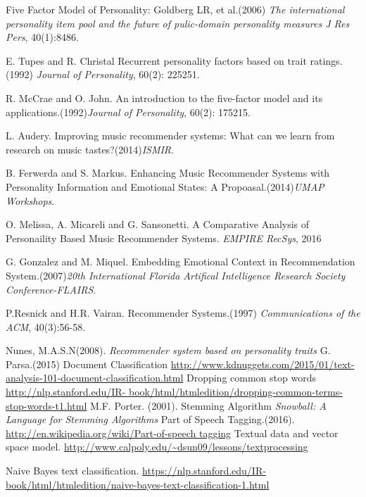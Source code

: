 
\newpage
{}
{}
\begin{thebibliography}{9}

	 Five Factor Model of Personality: Goldberg LR, et al.(2006) \textit{The international personality item pool and the future of pulic-domain personality measures J Res Pers}, 40(1):8486.
 
 E. Tupes and R. Christal Recurrent personality factors based on trait ratings.(1992) \textit{Journal of Personality}, 60(2): 225251.

 R. McCrae and O. John. An introduction to the five-factor model and its applications.(1992)\textit{Journal of Personality}, 60(2): 175215.

 L. Audery. Improving music recommender systems: What can we learn from research on music tastes?(2014)\textit{ISMIR}.

 B. Ferwerda and S. Markus. Enhancing Music Recommender Systems with Personality Information and Emotional States: A Propoasal.(2014)\textit{UMAP Workshops}.

	 O. Melissa, A. Micareli and G. Sansonetti. A Comparative Analysis of Personaility Based Music Recommender Systems. \textit{EMPIRE RecSys}, 2016

 G. Gonzalez and M. Miquel. Embedding Emotional Context in Recommendation System.(2007)\textit{20th International Florida Artifical Intelligence Research Society Conference-FLAIRS}.

 P.Resnick and H.R. Vairan. Recommender Systems.(1997) \textit{Communications of the ACM}, 40(3):56-58.

Nunes, M.A.S.N(2008). \textit{Recommender system based on personality traits}
	G. Parsa.(2015) Document Classification \url{http://www.kdnuggets.com/2015/01/text-analysis-101-document-classification.html}
	Dropping common stop words \url{http://nlp.stanford.edu/IR- book/html/htmledition/dropping-common-terms-stop-words-t1.html}
	M.F. Porter. (2001). Stemming Algorithm \textit{Snowball: A Language for Stemming Algorithms}
 Part of Speech Tagging.(2016). \url{http://en.wikipedia.org/wiki/Part-of-speech tagging}
Textual data and vector space model. \url{http://www.calpoly.edu/~dsun09/lessons/textprocessing}

	Naive Bayes text classification. \url{https://nlp.stanford.edu/IR-book/html/htmledition/naive-bayes-text-classification-1.html}


\end{thebibliography}
